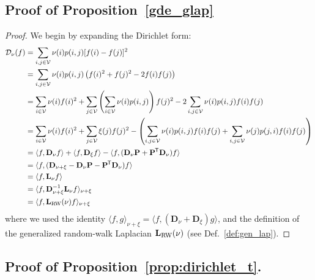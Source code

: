\documentclass[10pt]{article} %
\def\rmD{{\mathbf{D}}}
\def\rmL{{\mathbf{L}}}
\def\rmP{{\mathbf{P}}}
\def\gV{{\mathcal{V}}}
\renewcommand*{\top}{{\mkern-1.4mu\mathsf{T}}}
\begin{document}
\subsection{Proof of Proposition~\ref{gde_glap}}\label{proof:gdeglap}
\begin{proof}
  We begin by expanding the Dirichlet form:%
  \begin{align*}
    \mathcal{D}_{\nu}(f)
    &= \sum_{i,j \in \gV} \nu(i) p(i,j) [f(i) - f(j)]^2 \\
    &= \sum_{i,j \in \gV} \nu(i) p(i,j) \left( f(i)^2 + f(j)^2 - 2f(i)f(j) \right) \\
    &= \sum_{i \in \gV} \nu(i) f(i)^2
      + \sum_{j \in \gV} \left( \sum_{i \in \gV} \nu(i) p(i,j) \right) f(j)^2
      - 2 \sum_{i,j \in \gV} \nu(i) p(i,j) f(i) f(j) \\
    &= \sum_{i \in \gV} \nu(i) f(i)^2
      + \sum_{j \in \gV} \xi(j) f(j)^2
      - \left( \sum_{i,j \in \gV} \nu(i) p(i,j) f(i) f(j)
      + \sum_{i,j \in \gV} \nu(j) p(j,i) f(i) f(j) \right) \\
    &= \langle f, \rmD_{\nu} f \rangle
      + \langle f, \rmD_{\xi} f \rangle
      - \langle f, (\rmD_{\nu} \rmP + \rmP^{\top} \rmD_{\nu}) f \rangle \\
    &= \langle f, (\rmD_{\nu + \xi} - \rmD_{\nu} \rmP - \rmP^{\top} \rmD_{\nu}) f \rangle \\
    &= \langle f, \rmL_{\nu} f \rangle \\
    &= \langle f, \rmD_{\nu + \xi}^{-1} \rmL_{\nu} f \rangle_{\nu + \xi} \\
    &= \langle f, \rmL_{\textnormal{RW}}(\nu) f \rangle_{\nu + \xi}
  \end{align*}%
  where we used the identity $\langle f, g \rangle_{\nu + \xi} = \langle f, (\rmD_{\nu} + \rmD_{\xi}) g \rangle$, and the definition of the generalized random-walk Laplacian $\rmL_{\textnormal{RW}}(\nu)$ (see Def.~\ref{def:gen_lap}).
\end{proof}

\subsection{Proof of Proposition~\ref{prop:dirichlet_t}.}\label{proof:dirichlett}
\end{document}
